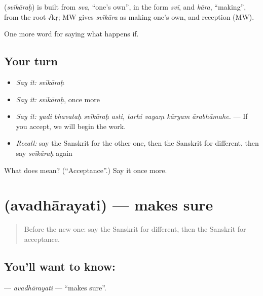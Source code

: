 \begin{cousinweb}
\textbf{} (\emph{svīkāraḥ}) is built from \emph{sva}, \textquotedblleft{}one's own\textquotedblright{}, in the form \emph{svī}, and \emph{kāra}, \textquotedblleft{}making\textquotedblright{}, from the root √kṛ; MW gives \emph{svīkāra} as making one's own, and reception (MW).
\end{cousinweb}

\begin{grammarlens}[title={What you've built}]
One more word for saying what happens if.
\end{grammarlens}

\subsection*{Your turn}
\begin{itemize}
\raggedright
  \item \emph{Say it:} \emph{svīkāraḥ}
  \item \emph{Say it:} \emph{svīkāraḥ}, once more
  \item \emph{Say it:} \emph{yadi bhavataḥ svīkāraḥ asti, tarhi vayaṃ kāryam ārabhāmahe.} — If you accept, we will begin the work.
  \item \emph{Recall:} say the Sanskrit for the other one, then the Sanskrit for different, then say \emph{svīkāraḥ} again
\end{itemize}

\begin{tcolorbox}[breakable,colback=teal!4,colframe=teal!35!black,title={Before you move on}]
What does  mean? (\textquotedblleft{}Acceptance\textquotedblright{}.) Say it once more.
\end{tcolorbox}
\section[\texorpdfstring{\sk{अवधारयति} (avadhārayati)}{अवधारयति (avadhārayati)}]{ (avadhārayati) — makes sure}

\label{lesson:SA-C542-avadharayati}



\begin{quote}
Before the new one: say the Sanskrit for different, then the Sanskrit for acceptance.
\end{quote}

\subsection*{You'll want to know: }
\textbf{} — \emph{avadhārayati} — \textquotedblleft{}makes sure\textquotedblright{}.

